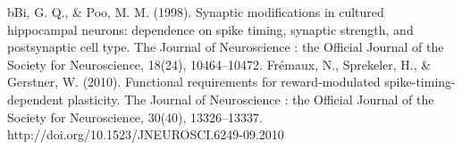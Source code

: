bBi, G. Q., & Poo, M. M. (1998). Synaptic modifications in cultured hippocampal neurons: dependence on spike timing, synaptic strength, and postsynaptic cell type. The Journal of Neuroscience : the Official Journal of the Society for Neuroscience, 18(24), 10464–10472.
Frémaux, N., Sprekeler, H., & Gerstner, W. (2010). Functional requirements for reward-modulated spike-timing-dependent plasticity. The Journal of Neuroscience : the Official Journal of the Society for Neuroscience, 30(40), 13326–13337. http://doi.org/10.1523/JNEUROSCI.6249-09.2010